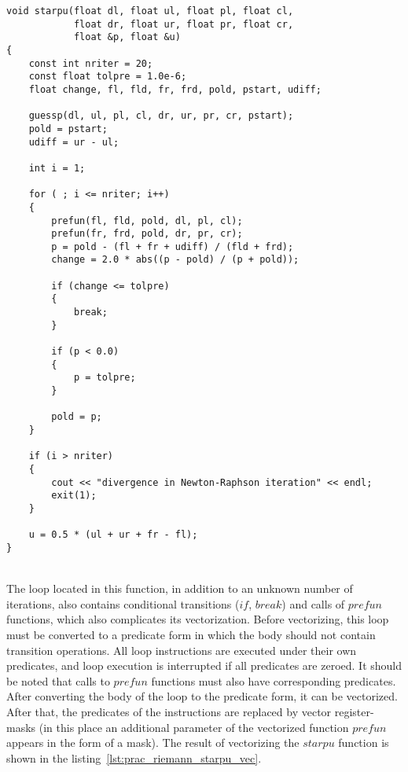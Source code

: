 \documentclass[
11pt,%
tightenlines,%
twoside,%
onecolumn,%
nofloats,%
nobibnotes,%
nofootinbib,%
superscriptaddress,%
noshowpacs,%
centertags]%
{revtex4}
\begin{document}
\begin{lstlisting}[caption={Original version of $starpu$.},label={lst:prac_riemann_starpu_orig}]
void starpu(float dl, float ul, float pl, float cl,
            float dr, float ur, float pr, float cr,
            float &p, float &u)
{
    const int nriter = 20;
    const float tolpre = 1.0e-6;
    float change, fl, fld, fr, frd, pold, pstart, udiff;

    guessp(dl, ul, pl, cl, dr, ur, pr, cr, pstart);
    pold = pstart;
    udiff = ur - ul;

    int i = 1;

    for ( ; i <= nriter; i++)
    {
        prefun(fl, fld, pold, dl, pl, cl);
        prefun(fr, frd, pold, dr, pr, cr);
        p = pold - (fl + fr + udiff) / (fld + frd);
        change = 2.0 * abs((p - pold) / (p + pold));

        if (change <= tolpre)
        {
            break;
        }

        if (p < 0.0)
        {
            p = tolpre;
        }

        pold = p;
    }

    if (i > nriter)
    {
        cout << "divergence in Newton-Raphson iteration" << endl;
        exit(1);
    }

    u = 0.5 * (ul + ur + fr - fl);
}
\end{lstlisting}

\ \\

The loop located in this function, in addition to an unknown number of iterations, also contains conditional transitions ($if$, $break$) and calls of $prefun$ functions, which also complicates its vectorization.
Before vectorizing, this loop must be converted to a predicate form in which the body should not contain transition operations.
All loop instructions are executed under their own predicates, and loop execution is interrupted if all predicates are zeroed.
It should be noted that calls to $prefun$ functions must also have corresponding predicates.
After converting the body of the loop to the predicate form, it can be vectorized. After that, the predicates of the instructions are replaced by vector register-masks (in this place an additional parameter of the vectorized function $prefun$ appears in the form of a mask).
The result of vectorizing the $starpu$ function is shown in the listing~\ref{lst:prac_riemann_starpu_vec}.
\end{document}
